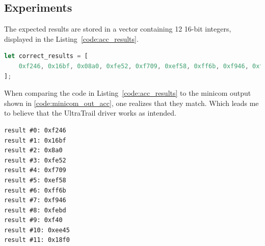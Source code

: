\subsection{Experiments}

The expected results are stored in a vector containing 12 16-bit integers, displayed in the Listing~\ref{code:acc_results}.

\begin{minipage}{\textwidth}
\begin{lstlisting}[style=colorEX,language=Rust,caption={The expected results from the driver test},label={code:acc_results}]
let correct_results = [
    0xf246, 0x16bf, 0x08a0, 0xfe52, 0xf709, 0xef58, 0xff6b, 0xf946, 0xfebd, 0x0f40, 0xee45, 0x18f0,
];
\end{lstlisting}
\end{minipage}

When comparing the code in Listing~\ref{code:acc_results} to the minicom output shown in \ref{code:minicom_out_acc},
one realizes that they match. Which leads me to believe that the UltraTrail driver works as intended.

\begin{minipage}{\textwidth}
\begin{lstlisting}[style=colorEx,caption={Minicom output after executing the driver test},label={code:minicom_out_acc}]
result #0: 0xf246
result #1: 0x16bf
result #2: 0x8a0
result #3: 0xfe52
result #4: 0xf709
result #5: 0xef58
result #6: 0xff6b
result #7: 0xf946
result #8: 0xfebd
result #9: 0xf40
result #10: 0xee45
result #11: 0x18f0
\end{lstlisting}
\end{minipage}
